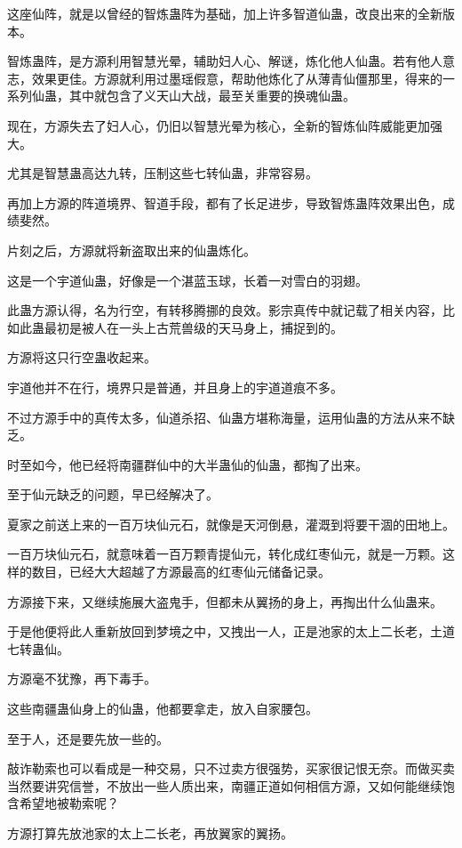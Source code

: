 \begin{this_body}
这座仙阵，就是以曾经的智炼蛊阵为基础，加上许多智道仙蛊，改良出来的全新版本。

智炼蛊阵，是方源利用智慧光晕，辅助妇人心、解谜，炼化他人仙蛊。若有他人意志，效果更佳。方源就利用过墨瑶假意，帮助他炼化了从薄青仙僵那里，得来的一系列仙蛊，其中就包含了义天山大战，最至关重要的换魂仙蛊。

现在，方源失去了妇人心，仍旧以智慧光晕为核心，全新的智炼仙阵威能更加强大。

尤其是智慧蛊高达九转，压制这些七转仙蛊，非常容易。

再加上方源的阵道境界、智道手段，都有了长足进步，导致智炼蛊阵效果出色，成绩斐然。

片刻之后，方源就将新盗取出来的仙蛊炼化。

这是一个宇道仙蛊，好像是一个湛蓝玉球，长着一对雪白的羽翅。

此蛊方源认得，名为行空，有转移腾挪的良效。影宗真传中就记载了相关内容，比如此蛊最初是被人在一头上古荒兽级的天马身上，捕捉到的。

方源将这只行空蛊收起来。

宇道他并不在行，境界只是普通，并且身上的宇道道痕不多。

不过方源手中的真传太多，仙道杀招、仙蛊方堪称海量，运用仙蛊的方法从来不缺乏。

时至如今，他已经将南疆群仙中的大半蛊仙的仙蛊，都掏了出来。

至于仙元缺乏的问题，早已经解决了。

夏家之前送上来的一百万块仙元石，就像是天河倒悬，灌溉到将要干涸的田地上。

一百万块仙元石，就意味着一百万颗青提仙元，转化成红枣仙元，就是一万颗。这样的数目，已经大大超越了方源最高的红枣仙元储备记录。

方源接下来，又继续施展大盗鬼手，但都未从翼扬的身上，再掏出什么仙蛊来。

于是他便将此人重新放回到梦境之中，又拽出一人，正是池家的太上二长老，土道七转蛊仙。

方源毫不犹豫，再下毒手。

这些南疆蛊仙身上的仙蛊，他都要拿走，放入自家腰包。

至于人，还是要先放一些的。

敲诈勒索也可以看成是一种交易，只不过卖方很强势，买家很记恨无奈。而做买卖当然要讲究信誉，不放出一些人质出来，南疆正道如何相信方源，又如何能继续饱含希望地被勒索呢？

方源打算先放池家的太上二长老，再放翼家的翼扬。


\end{this_body}
